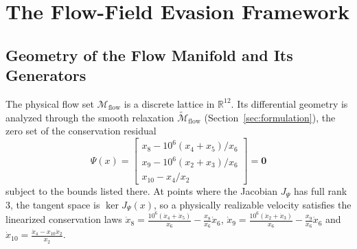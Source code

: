 \section{The Flow-Field Evasion Framework}
\label{sec:framework}

\subsection{Geometry of the Flow Manifold and Its Generators}
\label{sec:geometry}

The physical flow set $\mathcal{M}_{\text{flow}}$ is a discrete lattice in $\mathbb{R}^{12}$. Its differential geometry is analyzed through the smooth relaxation $\widetilde{\mathcal{M}}_{\text{flow}}$ (Section~\ref{sec:formulation}), the zero set of the conservation residual
\begin{equation}
    \Psi(x)=\begin{bmatrix} x_8-10^6(x_4+x_5)/x_6\\ x_9-10^6(x_2+x_3)/x_6\\ x_{10}-x_4/x_2\end{bmatrix}=\mathbf{0}
\end{equation}
subject to the bounds listed there. At points where the Jacobian $J_\Psi$ has full rank 3, the tangent space is $\ker J_\Psi(x)$, so a physically realizable velocity satisfies the linearized conservation laws $\dot x_8=\tfrac{10^6(\dot x_4+\dot x_5)}{x_6}-\tfrac{x_8}{x_6}\dot x_6$, $\dot x_9=\tfrac{10^6(\dot x_2+\dot x_3)}{x_6}-\tfrac{x_9}{x_6}\dot x_6$ and $\dot x_{10}=\tfrac{\dot x_4-x_{10}\dot x_2}{x_2}$.

